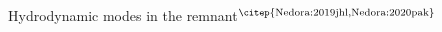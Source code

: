 \begin{frame}{Hydrodynamic modes in the \pmerg{} remnant$^\text{\citep{Nedora:2019jhl,Nedora:2020pak}}$}
\end{frame}



%

%



